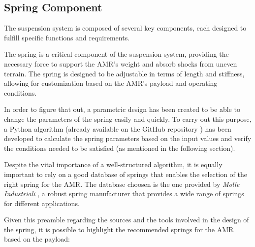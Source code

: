 \documentclass[11pt]{article}
\begin{document}
\newpage

\subsection{Spring Component}
The suspension system is composed of several key components, each designed to fulfill specific functions and requirements.

The spring is a critical component of the suspension system, providing the necessary force to support the AMR's weight and absorb shocks from uneven terrain. The spring is designed to be adjustable in terms of length and stiffness, allowing for customization based on the AMR's payload and operating conditions.

In order to figure that out, a parametric design has been created to be able to change the parameters of the spring easily and quickly. To carry out this purpose, a Python algorithm (already available on
the GitHub repository \cite{github_repository}) has been developed to calculate the spring parameters based on the input values and verify the conditions needed to be satisfied (as mentioned in the following section).

Despite the vital importance of a well-structured algorithm, it is equally important to rely on a good database of springs that enables the selection of the right spring for the AMR. The database choosen is the one provided by \textit{Molle Industriali} \cite{molle_industriali_source}, a robust spring manufacturer that provides a wide range of springs for different applications.

Given this preamble regarding the sources and the tools involved in the design of the spring, it is possible to highlight the recommended springs for the AMR based on the payload:
\end{document}
